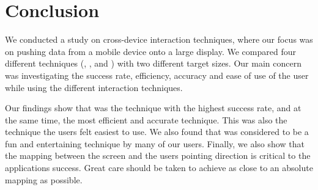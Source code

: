 \section{Conclusion}

We conducted a study on cross-device interaction techniques, where our focus was on pushing data from a mobile device onto a large display.
We compared four different techniques (\pinch, \swipe, \throw and \tilt) with two different target sizes.
Our main concern was investigating the success rate, efficiency, accuracy and ease of use of the user while using the different interaction techniques.

Our findings show that \swipe was the technique with the highest success rate, and at the same time, the most efficient and accurate technique.
This was also the technique the users felt easiest to use.
We also found that \pinch was considered to be a fun and entertaining technique by many of our users.
Finally, we also show that the mapping between the screen and the users pointing direction is critical to the applications success. 
Great care should be taken to achieve as close to an absolute mapping as possible. 